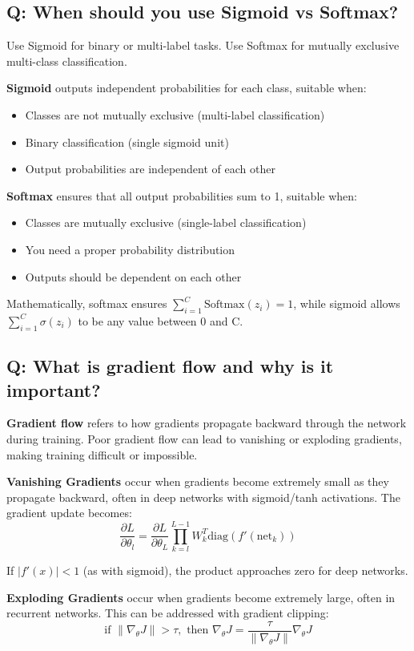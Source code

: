 \subsection*{Q: When should you use Sigmoid vs Softmax?}
Use Sigmoid for binary or multi-label tasks. Use Softmax for mutually exclusive multi-class classification.

\textbf{Sigmoid} outputs independent probabilities for each class, suitable when:
\begin{itemize}
	\item Classes are not mutually exclusive (multi-label classification)
	\item Binary classification (single sigmoid unit)
	\item Output probabilities are independent of each other
\end{itemize}

\textbf{Softmax} ensures that all output probabilities sum to 1, suitable when:
\begin{itemize}
	\item Classes are mutually exclusive (single-label classification)
	\item You need a proper probability distribution
	\item Outputs should be dependent on each other
\end{itemize}

Mathematically, softmax ensures \(\sum_{i=1}^{C} \text{Softmax}(z_i) = 1\), while sigmoid allows \(\sum_{i=1}^{C} \sigma(z_i)\) to be any value between 0 and C.

\subsection*{Q: What is gradient flow and why is it important?}
\textbf{Gradient flow} refers to how gradients propagate backward through the network during training. Poor gradient flow can lead to vanishing or exploding gradients, making training difficult or impossible.

\textbf{Vanishing Gradients} occur when gradients become extremely small as they propagate backward, often in deep networks with sigmoid/tanh activations. The gradient update becomes:
\[
\frac{\partial L}{\partial \theta_l} = \frac{\partial L}{\partial \theta_L} \prod_{k=l}^{L-1} W_k^T \text{diag}(f'(\text{net}_k))
\]

If \(|f'(x)| < 1\) (as with sigmoid), the product approaches zero for deep networks.

\textbf{Exploding Gradients} occur when gradients become extremely large, often in recurrent networks. This can be addressed with gradient clipping:
\[
\text{if } \|\nabla_\theta J\| > \tau, \text{ then } \nabla_\theta J = \frac{\tau}{\|\nabla_\theta J\|} \nabla_\theta J
\]

